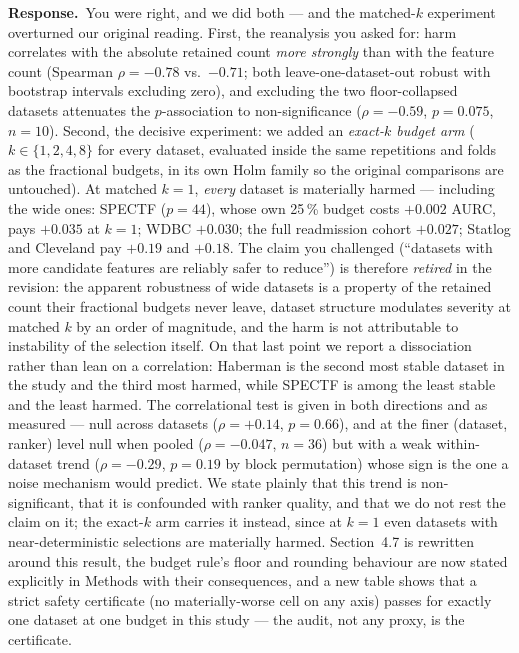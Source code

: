 \documentclass[11pt]{article}
\newcommand{\reply}{\par\noindent\textbf{Response.}\ }
\begin{document}
\reply You were right, and we did both --- and the matched-$k$ experiment overturned our original
reading. First, the reanalysis you asked for: harm correlates with the absolute retained count
\emph{more strongly} than with the feature count (Spearman $\rho=-0.78$ vs.\ $-0.71$; both
leave-one-dataset-out robust with bootstrap intervals excluding zero), and excluding the two
floor-collapsed datasets attenuates the $p$-association to non-significance ($\rho=-0.59$,
$p=0.075$, $n=10$). Second,
the decisive experiment: we added an \emph{exact-$k$ budget arm} ($k\in\{1,2,4,8\}$ for every
dataset, evaluated inside the same repetitions and folds as the fractional budgets, in its own Holm
family so the original comparisons are untouched). At matched $k=1$, \emph{every} dataset is
materially harmed --- including the wide ones: SPECTF ($p=44$), whose own 25\,\% budget costs
$+0.002$ AURC, pays $+0.035$ at $k=1$; WDBC $+0.030$; the full readmission cohort $+0.027$; Statlog
and Cleveland pay $+0.19$ and $+0.18$. The claim you challenged (``datasets with more candidate
features are reliably safer to reduce'') is therefore \emph{retired} in the revision: the apparent
robustness of wide datasets is a property of the retained count their fractional budgets never
leave, dataset structure modulates severity at matched $k$ by an order of magnitude, and the harm is
not attributable to instability of the selection itself. On that last point we report a dissociation
rather than lean on a correlation: Haberman is the second most stable dataset in the study and the
third most harmed, while SPECTF is among the least stable and the least harmed. The correlational
test is given in both directions and as measured --- null across datasets ($\rho=+0.14$, $p=0.66$),
and at the finer (dataset, ranker) level null when pooled ($\rho=-0.047$, $n=36$) but with a weak
within-dataset trend ($\rho=-0.29$, $p=0.19$ by block permutation) whose sign is the one a
noise mechanism would predict. We state plainly that this trend is non-significant, that it is
confounded with ranker quality, and that we do not rest the claim on it; the exact-$k$ arm carries
it instead, since at $k=1$ even datasets with near-deterministic selections are materially harmed.
Section~4.7 is rewritten around this result, the
budget rule's floor and rounding behaviour are now stated explicitly in Methods with their
consequences, and a new table shows that a strict safety certificate (no materially-worse cell on
any axis) passes for exactly one dataset at one budget in this study --- the audit, not any proxy,
is the certificate.
\end{document}
